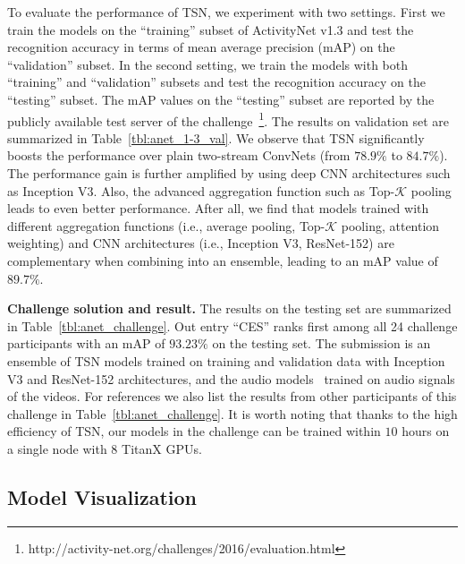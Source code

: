 \documentclass[10pt,journal,compsoc]{IEEEtran}
\begin{document}
To evaluate the performance of TSN, we experiment with two settings.
First we train the models on the ``training'' subset of ActivityNet v1.3 and test the recognition accuracy in terms of mean average precision (mAP) on the ``validation'' subset.
In the second setting, we train the models with both ``training'' and ``validation'' subsets and test the recognition accuracy on the ``testing'' subset.
The mAP values on the ``testing'' subset are reported by the publicly available test server of the challenge~\footnote{http://activity-net.org/challenges/2016/evaluation.html}.
The results on validation set are summarized in Table~\ref{tbl:anet_1-3_val}. We observe that TSN significantly boosts the performance over plain two-stream ConvNets (from $78.9\%$ to $84.7\%$). The performance gain is further amplified by using deep CNN architectures such as Inception V3.
Also, the advanced aggregation function such as Top-$\mathcal{K} $ pooling leads to even better performance.
After all, we find that models trained with different aggregation functions (i.e., average pooling, Top-$\mathcal{K}$ pooling, attention weighting) and CNN architectures (i.e., Inception V3, ResNet-152) are complementary when combining into an ensemble, leading to an mAP value of $ 89.7\% $.

{\bf Challenge solution and result.} The results on the testing set are summarized in Table~\ref{tbl:anet_challenge}.
Out entry ``CES'' ranks first among all 24 challenge participants with an mAP of $ 93.23\% $ on the testing set.
The submission is an ensemble of TSN models trained on training and validation data with Inception V3 and ResNet-152 architectures, and the audio models~\cite{ZhuEH16} trained on audio signals of the videos.
For references we also list the results from other participants of this challenge in Table~\ref{tbl:anet_challenge}.
It is worth noting that thanks to the high efficiency of TSN, our models in the challenge can be trained within $ 10 $ hours on a single node with $ 8 $ TitanX GPUs.



\subsection{Model Visualization}
\end{document}

